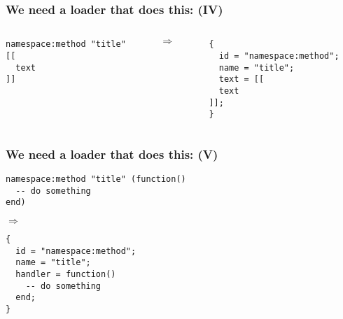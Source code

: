 \documentclass[handout]{beamer}
\begin{document}

\begin{frame}[fragile]

\frametitle{We need a loader that does this: (IV)}

\begin{columns}

\begin{column}{0.5\textwidth}
\begin{verbatim}
namespace:method "title"
[[
  text
]]
\end{verbatim}
\end{column}

\begin{column}{0.05\textwidth}
$\Rightarrow$
\end{column}

\begin{column}{0.5\textwidth}
\begin{verbatim}
{
  id = "namespace:method";
  name = "title";
  text = [[
  text
]];
}
\end{verbatim}
\end{column}

\end{columns}

\end{frame}


\begin{frame}[fragile]

\frametitle{We need a loader that does this: (V)}

\begin{verbatim}
namespace:method "title" (function()
  -- do something
end)
\end{verbatim}

$\Rightarrow$

\begin{verbatim}
{
  id = "namespace:method";
  name = "title";
  handler = function()
    -- do something
  end;
}
\end{verbatim}

\end{frame}

\end{document}
